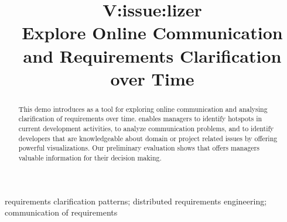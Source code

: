 
\title{V:issue:lizer\\Explore Online Communication and  Requirements Clarification over Time}


\author{
}

\maketitle


\begin{abstract}
This demo introduces \viss as a tool for exploring online communication and analysing clarification of requirements over time.
\viss enables managers to identify hotspots in current development activities, to analyze communication problems, and to identify developers that are knowledgeable about domain or project related issues by offering powerful visualizations.
Our preliminary evaluation shows that \viss offers managers valuable information for their decision making.
\end{abstract}

\begin{IEEEkeywords}
requirements clarification patterns; distributed requirements engineering; communication of requirements
\end{IEEEkeywords}
